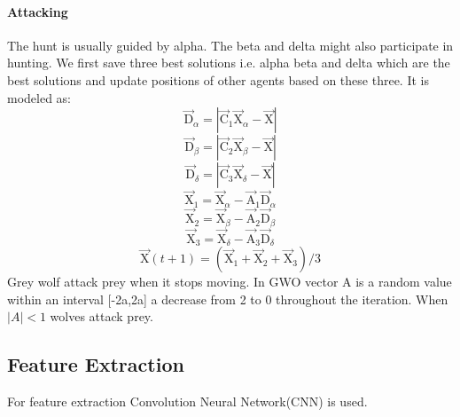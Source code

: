 \documentclass[12pt,a4paper]{article}
\begin{document}
\paragraph{Attacking}
The hunt is usually guided by alpha. The beta and delta might also participate in hunting. We first save three best solutions i.e. alpha beta and delta which are the best solutions and update positions of other agents based on these three. It is modeled as:
\begin{equation}
    \overrightarrow{\text{D}}_\alpha = |\overrightarrow{\text{C}}_1 \overrightarrow{\text{X}}_\alpha - \overrightarrow{\text{X}}|
\end{equation}
\begin{equation}
    \overrightarrow{\text{D}}_\beta = |\overrightarrow{\text{C}}_2 \overrightarrow{\text{X}}_\beta - \overrightarrow{\text{X}}|
\end{equation}
\begin{equation}
    \overrightarrow{\text{D}}_\delta = |\overrightarrow{\text{C}}_3 \overrightarrow{\text{X}}_\delta - \overrightarrow{\text{X}}|
\end{equation}
\begin{equation}
    \overrightarrow{\text{X}}_1 = \overrightarrow{\text{X}}_\alpha - \overrightarrow{\text{A}}_1 \overrightarrow{\text{D}}_\alpha
\end{equation}
\begin{equation}
    \overrightarrow{\text{X}}_2 = \overrightarrow{\text{X}}_\beta - \overrightarrow{\text{A}}_2 \overrightarrow{\text{D}}_\beta
\end{equation}
\begin{equation}
    \overrightarrow{\text{X}}_3 = \overrightarrow{\text{X}}_\delta - \overrightarrow{\text{A}}_3 \overrightarrow{\text{D}}_\delta
\end{equation}
\begin{equation}
    \overrightarrow{\text{X}}(t+1) = (\overrightarrow{\text{X}}_1 + \overrightarrow{\text{X}}_2 + \overrightarrow{\text{X}}_3) / 3
\end{equation}
Grey wolf attack prey when it stops moving. In GWO vector A is a random value within an interval [-2a,2a] a decrease from 2 to 0 throughout the iteration. When $|A|<1$ wolves attack prey.

\subsection{Feature Extraction}
For feature extraction Convolution Neural Network(CNN) is used.
\end{document}
